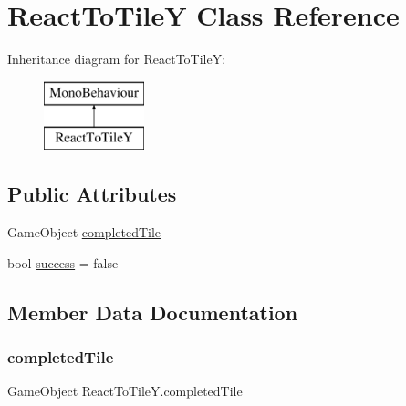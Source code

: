 \hypertarget{class_react_to_tile_y}{}\section{React\+To\+TileY Class Reference}
\label{class_react_to_tile_y}
Inheritance diagram for React\+To\+TileY\+:\begin{figure}[H]
\begin{center}
\leavevmode
\includegraphics[height=2.000000cm]{class_react_to_tile_y}
\end{center}
\end{figure}
\subsection*{Public Attributes}
\begin{DoxyCompactItemize}
\item 
Game\+Object \hyperlink{class_react_to_tile_y_ae3df818efe318cd6f60049a4210766fc}{completed\+Tile}
\item 
bool \hyperlink{class_react_to_tile_y_a79b3272c2b43829af152ead059a82f5f}{success} = false
\end{DoxyCompactItemize}


\subsection{Member Data Documentation}
\mbox{\label{class_react_to_tile_y_ae3df818efe318cd6f60049a4210766fc}} 
\subsubsection{\texorpdfstring{completed\+Tile}{completedTile}}
{\footnotesize\ttfamily Game\+Object React\+To\+Tile\+Y.\+completed\+Tile}

\mbox{\label{class_react_to_tile_y_a79b3272c2b43829af152ead059a82f5f}} 
